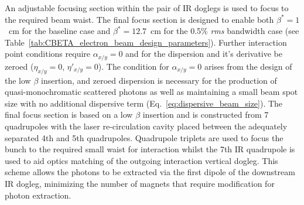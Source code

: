 \documentclass[../main.tex]{subfiles}
\begin{document}
An adjustable focusing section within the pair of IR doglegs is used to focus to the required beam waist. The final focus section is designed to enable both $\beta^{*} = 1$~\si{\centi\meter} for the baseline case and $\beta^{*} = 12.7$~\si{\centi\meter} for the 0.5\% \textit{rms} bandwidth case (see Table~\ref{tab:CBETA_electron_beam_design_parameters}). Further interaction point conditions require $\alpha_{x/y} =0$ and for the dispersion and it's derivative be zeroed ($\eta_{x/y} = 0$, $\eta'_{x/y} = 0$). The condition for $\alpha_{x/y} = 0$ arises from the design of the low $\beta$ insertion, and zeroed dispersion is necessary for the production of quasi-monochromatic scattered photons as well as maintaining a small beam spot size with no additional dispersive term (Eq.~\ref{eq:dispersive_beam_size}). The final focus section is based on a low $\beta$ insertion \cite{chao2013handbook} and is constructed from 7 quadrupoles with the laser re-circulation cavity placed between the adequately separated 4th and 5th quadrupoles. Quadrupole triplets are used to focus the bunch to the required small waist for interaction whilst the 7th IR quadrupole is used to aid optics matching of the outgoing interaction vertical dogleg. This scheme allows the photons to be extracted via the first dipole of the downstream IR dogleg, minimizing the number of magnets that require modification for photon extraction. 
\end{document}
